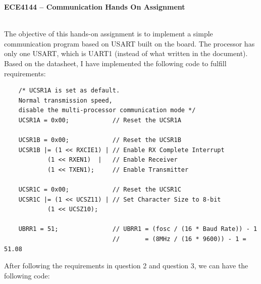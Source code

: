 \documentclass{article}
\begin{document}
\begin{minipage}{0.9\textwidth}
    \centering
    \Large
    \textbf{ECE4144 – Communication Hands On Assignment}
\end{minipage}\\[1em]
The objective of this hands-on assignment is to implement a simple communication program based on USART built on the board. The processor has only one USART, which is UART1 (instead of what written in the document). Based on the datasheet, I have implemented the following code to fulfill requirements:
\begin{verbatim}
    /* UCSR1A is set as default. 
    Normal transmission speed, 
    disable the multi-processor communication mode */
    UCSR1A = 0x00;            // Reset the UCSR1A

    UCSR1B = 0x00;            // Reset the UCSR1B
    UCSR1B |= (1 << RXCIE1) | // Enable RX Complete Interrupt
            (1 << RXEN1)  |   // Enable Receiver
            (1 << TXEN1);     // Enable Transmitter

    UCSR1C = 0x00;            // Reset the UCSR1C
    UCSR1C |= (1 << UCSZ11) | // Set Character Size to 8-bit
            (1 << UCSZ10);
            
    UBRR1 = 51;               // UBRR1 = (fosc / (16 * Baud Rate)) - 1
                              //       = (8MHz / (16 * 9600)) - 1 = 51.08
\end{verbatim}
After following the requirements in question 2 and question 3, we can have the following code:
\end{document}
